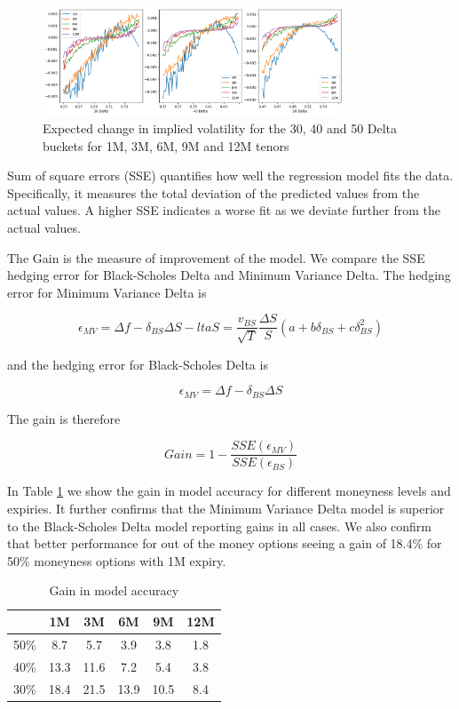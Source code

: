 \documentclass{article}
\newcommand{\para}{\vspace{8pt}} %
\begin{document}
\begin{figure}[h]
    \centering
    \includegraphics[width=0.8\textwidth]{images/eiv.png}
    \caption{Expected change in implied volatility for the 30, 40 and 50 Delta buckets for 1M, 3M, 6M, 9M and 12M tenors}
    \label{fig:eiv}
\end{figure}


Sum of square errors (SSE) quantifies how well the regression model fits the data. 
Specifically, it measures the total deviation of the predicted values from the actual values. A higher SSE indicates a worse fit as we
deviate further from the actual values. 

\para
The Gain is the measure of improvement of the model. We compare the SSE hedging error for Black-Scholes Delta and Minimum Variance Delta. The hedging
error for Minimum Variance Delta is 

\[
\epsilon_{MV} = \Delta f - \delta_{BS} \Delta S - lta S = \frac{v_{BS}}{\sqrt{T}} \frac{\Delta S}{S} (a + b \delta_{BS} + c \delta_{BS}^2)
\]

and the hedging error for Black-Scholes Delta is

\[
\epsilon_{MV} = \Delta f - \delta_{BS} \Delta S
\]

The gain is therefore 

\[
Gain = 1 - \frac{SSE(\epsilon_{MV})}{SSE(\epsilon_{BS})}
\]

In Table \ref{tab:gain} we show the gain in model accuracy for different moneyness levels and expiries. It further confirms that the Minimum Variance Delta model
is superior to the Black-Scholes Delta model reporting gains in all cases. We also confirm that better performance for out of the money options seeing a gain of
18.4\% for 50\% moneyness options with 1M expiry.

\begin{table}[ht]
    \centering
    \caption{Gain in model accuracy}
    \label{tab:gain}
    \begin{tabular}{|c|c|c|c|c|c|}
        \hline
         &1M & 3M & 6M & 9M & 12M \\
        \hline
        50\% &  8.7 &  5.7 &  3.9 &  3.8 & 1.8 \\
        40\% & 13.3 & 11.6 &  7.2 &  5.4 & 3.8 \\
        30\% & 18.4 & 21.5 & 13.9 & 10.5 & 8.4 \\
        \hline
    \end{tabular}
\end{table}
\end{document}
